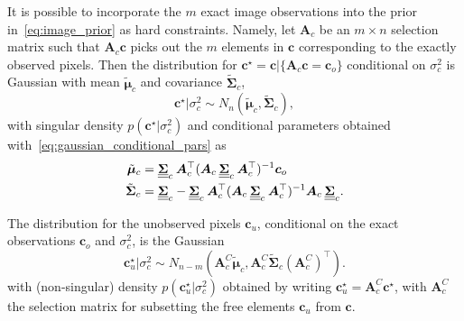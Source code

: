 \documentclass[12pt]{article}
\newcommand{\mybcirc}[1] {\underline{\underline{\bm{#1}}}}
\begin{document}
It is possible to incorporate the $m$ exact image observations into the prior in~\eqref{eq:image_prior} as hard constraints. Namely, let $\bm{A}_c$ be an $m \times n$ selection matrix such that $\bm{A}_c \bm{c}$ picks out the $m$ elements in $\bm{c}$ corresponding to the exactly observed pixels.
Then the distribution for $\bm{c}^{\star} = \bm{c} | \{\bm{A}_c \bm{c} = \bm{c}_o \}$ conditional on $\sigma_c^2$ is Gaussian with mean $\tilde{\bm{\mu}}_c$ and covariance $\tilde{\bm{\Sigma}}_c$, 
\begin{equation} \label{eq:image_constrained_prior}
    \bm{c}^{\star}|\sigma_c^2 \sim N_n(\tilde{\bm{\mu}}_c, \tilde{\bm{\Sigma}}_c),    
\end{equation}
with singular density $p(\bm{c}^{\star}|\sigma_c^2)$ and conditional parameters obtained with~\eqref{eq:gaussian_conditional_pars} as
\begin{equation} \label{eq:Sigma_c_star}
\begin{split}
    \tilde{\bm{\mu}}_c &= \mybcirc{\Sigma}_c\hspace*{0.07cm} \bm{A}_c^{\top} (\bm{A}_c\hspace*{0.07cm} \mybcirc{\Sigma}_c\hspace*{0.07cm} \bm{A}_c^{\top})^{-1} \bm{c}_o \\
    \tilde{\bm{\Sigma}}_c &= \mybcirc{\Sigma}_c - \mybcirc{\Sigma}_c\hspace*{0.07cm} \bm{A}_c^{\top} (\bm{A}_c\hspace*{0.07cm} \mybcirc{\Sigma}_c\hspace*{0.07cm} \bm{A}_c^{\top})^{-1} \bm{A}_c\hspace*{0.07cm} \mybcirc{\Sigma}_c.
\end{split}
\end{equation} 

The distribution for the unobserved pixels $\bm{c}_u$, conditional on the exact observations $\bm{c}_o$ and $\sigma_c^2$, is the Gaussian 
\begin{equation}
    \bm{c}_u^{\star} | \sigma_c^2 \sim N_{n - m}(\bm{A}_c^C \tilde{\bm{\mu}}_c, \bm{A}_c^C \tilde{\bm{\Sigma}}_{c}(\bm{A}_c^C)^{\top}).
\end{equation}
with (non-singular) density $p(\bm{c}_u^{\star} | \sigma_c^2)$ obtained by writing $\bm{c}_u^{\star} = \bm{A}_c^C \bm{c}^{\star}$, with $\bm{A}_c^C$ the selection matrix for subsetting the free elements $\bm{c}_u$ from $\bm{c}$.
\end{document}
